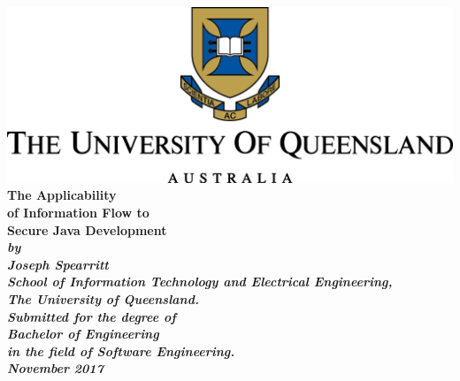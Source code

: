 \begin{titlepage}
	\renewcommand{\baselinestretch}{1.0}
	\centering
	\includegraphics{content/uqlogo.png}\\
	\vspace*{15mm}
	\Huge\bf
	The Applicability\\of Information Flow to\\Secure Java Development\\
	\vspace{20mm}
	\large\sl
	by\\
	Joseph Spearritt
	\medskip\\
	\rm
	School of Information Technology and Electrical Engineering,\\
	The University of Queensland.\\
	\vspace{30mm}
	Submitted for the degree of\\
	Bachelor of Engineering
	\smallskip\\
	\normalsize
	in the field of Software Engineering.
	\medskip\\
	\large
	November 2017	
\end{titlepage}